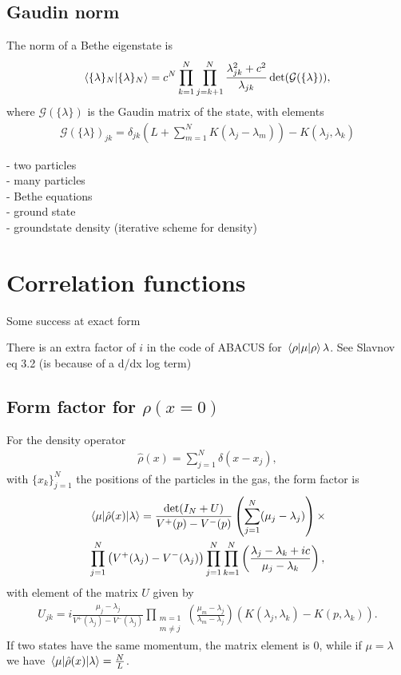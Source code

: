 \documentclass[11pt, a4paper]{report} %
\begin{document}
\subsection{Gaudin norm}
The norm of a Bethe eigenstate is~\cite{Caux2007}
\begin{align}
  \braket{\{\lambda\}_N}{\{\lambda\}_N} = c^N \prod_{k=1}^N \prod_{j=k+1}^N \frac{\lambda_{jk}^2 + c^2}{\lambda_{jk}} \det(\mathcal{G}(\{\lambda\})),
\end{align}
where $\mathcal{G}(\{\lambda\})$ is the Gaudin matrix of the state, with elements
\begin{align}\label{eq:gaudin}
  \mathcal{G}(\{\lambda\})_{jk} = \delta_{jk} \left(L + \sum_{m=1}^{N}K(\lambda_j-\lambda_m)\right) - K(\lambda_j, \lambda_k)
\end{align}


- two particles \\
- many particles\\
- Bethe equations\\
- ground state\\
- groundstate density (iterative scheme for density)\cite{Zemyan2012}




\section{Correlation functions}
Some success at exact form~\cite{Nardis2016,slavnov89_calcul_scalar_produc_wave_funct}

There is an extra factor of $i$ in the code of ABACUS for $\expval{\mu}{\rho}{\lambda}$.
See Slavnov eq 3.2 (is because of a d/dx log term)


\subsection{Form factor for $\rho(x=0)$}
For the density operator
\begin{align}
  \hat{\rho}(x) = \sum_{j=1}^N \delta(x-x_j),
\end{align}
with \(\{x_k\}_{j=1}^N\) the positions of the particles in the gas, the form factor is~\cite{slavnov90_noneq_time_curren_correl_funct, Nardis2015}
\begin{multline}
  \matrixel{\mathbf{\mu}}{\hat{\rho}(x)}{\mathbf{\lambda}} = \frac{\det(I_N +U)}{V^+(p) - V^-(p)}
  \left(\sum_{j=1}^N(\mu_j-\lambda_j)\right) \times\\ \prod_{j=1}^N\left(V^+(\lambda_j) - V^-(\lambda_j)\right)\prod_{j=1}^N\prod_{k=1}^N\left(\frac{\lambda_j-\lambda_k+ic}{\mu_j-\lambda_k}\right),
\end{multline}
with element of the matrix \(U\) given by
\begin{align}
  U_{jk} = i \frac{\mu_j-\lambda_j}{V^+(\lambda_j) -V^-(\lambda_j)}\prod_{\substack{m=1\\m\neq j}} \left(\frac{\mu_m - \lambda_j}{\lambda_m-\lambda_j}\right) \left(K(\lambda_j, \lambda_k) - K(p, \lambda_k)\right).
\end{align}
If two states have the same momentum, the matrix element is 0, while if $\mu = \lambda$ we have $\matrixel{\mathbf{\mu}}{\hat{\rho}(x)}{\mathbf{\lambda}}=\frac{N}{L}$.
\end{document}
